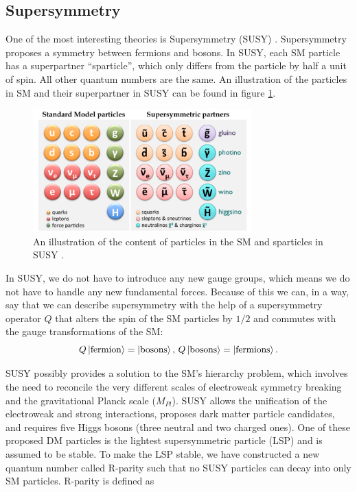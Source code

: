 \subsection{Supersymmetry}
\label{sec:SUSY}
One of the most interesting theories is Supersymmetry (SUSY) \cite{sleptonexclusion}. Supersymmetry proposes a symmetry between fermions and bosons. In SUSY, each SM particle has a superpartner “sparticle”, which only differs from the particle by half a unit of spin. All other quantum numbers are the same. An illustration of the particles in SM and their superpartner in SUSY can be found in figure \ref{fig:smandsusy}.

\begin{figure}[H]
    \centering
    \includegraphics[width = 0.75\textwidth]{Figures/FromOnline/susy_particles.png}
    \caption{An illustration of the content of particles in the SM and sparticles in SUSY \cite{SUSYpic}.}
    \label{fig:smandsusy}
\end{figure}

In SUSY, we do not have to introduce any new gauge groups, which means we do not have to handle any new fundamental forces. Because of this we can, in a way, say that we can describe supersymmetry with the help of a supersymmetry operator $Q$ that alters the spin of the SM particles by $1/2$ and commutes with the gauge transformations of the SM: 
\begin{equation}
    \label{eq:SUSY}
    Q\ket{\mathrm{fermion}} = \ket{\mathrm{bosons}} \text{,   }  Q\ket{\mathrm{bosons}} =\ket{\mathrm{fermions}}.
\end{equation}

SUSY possibly provides a solution to the SM's hierarchy problem, which involves the need to reconcile the very different scales of electroweak symmetry breaking and the gravitational Planck scale ($M_{Pl}$). SUSY allows the unification of the electroweak and strong interactions, proposes dark matter particle candidates, and requires five Higgs bosons (three neutral and two charged ones). One of these proposed DM particles is the lightest supersymmetric particle (LSP) and is assumed to be stable. To make the LSP stable, we have constructed a new quantum number called R-parity such that no SUSY particles can decay into only SM particles. R-parity is defined as 

